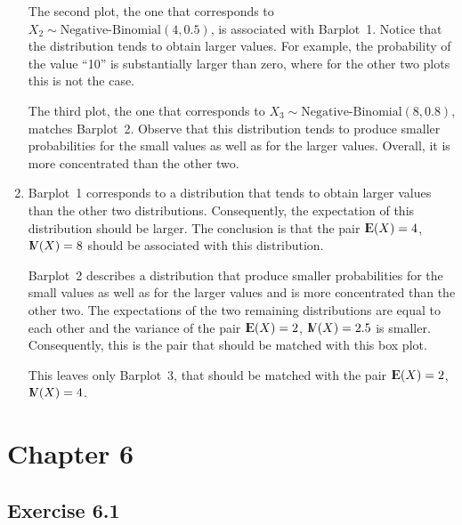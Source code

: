 \documentclass[]{krantz}
\newcommand{\Expec}{{\rm I\kern-.3em E}}
\newcommand{\Var}{{\rm I\kern-.3em V}}
\theoremstyle{definition}
\theoremstyle{definition}
\theoremstyle{definition}
\theoremstyle{remark}
\begin{document}
\begin{enumerate}
  The second plot, the one that corresponds to
  \(X_2 \sim \mbox{Negative-Binomial}(4,0.5)\), is associated with
  Barplot~1. Notice that the distribution tends to obtain larger values.
  For example, the probability of the value ``10'' is substantially
  larger than zero, where for the other two plots this is not the case.

  The third plot, the one that corresponds to
  \(X_3 \sim \mbox{Negative-Binomial}(8,0.8)\), matches Barplot~2.
  Observe that this distribution tends to produce smaller probabilities
  for the small values as well as for the larger values. Overall, it is
  more concentrated than the other two.
\item
  Barplot~1 corresponds to a distribution that tends to obtain larger
  values than the other two distributions. Consequently, the expectation
  of this distribution should be larger. The conclusion is that the pair
  \(\Expec(X) = 4\), \(\Var(X) = 8\) should be associated with this
  distribution.

  Barplot~2 describes a distribution that produce smaller probabilities
  for the small values as well as for the larger values and is more
  concentrated than the other two. The expectations of the two remaining
  distributions are equal to each other and the variance of the pair
  \(\Expec(X) = 2\), \(\Var(X) = 2.5\) is smaller. Consequently, this is
  the pair that should be matched with this box plot.

  This leaves only Barplot~3, that should be matched with the pair
  \(\Expec(X) = 2\), \(\Var(X) = 4\).
\end{enumerate}

\section*{Chapter 6}\label{chapter-6}


\subsection*{Exercise 6.1}\label{exercise-6.1}
\end{document}
